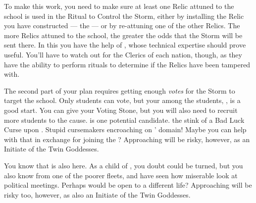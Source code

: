 \documentclass[char]{GL2020}
\begin{document}
To make this work, you need to make sure at least one Relic attuned to the school is used in the Ritual to Control the Storm, either by installing the Relic you have constructed — the \iHorseshoe{} — or by re-attuning one of the other Relics. The more Relics attuned to the school, the greater the odds that the Storm will be sent there. In this you have the help of \cChupInventor{}, whose technical expertise should prove useful. You'll have to watch out for the Clerics of each nation, though, as they have the ability to perform rituals to determine if the Relics have been tampered with. 

The second part of your plan requires getting enough \emph{votes} for the Storm to target the school. Only students can vote, but your \pGoatie{} among the students, \cChupStudent{}, is a good start. You can give \cChupStudent{\them} your Voting Stone, but you will also need to recruit more students to the cause. \cInitiate{\full} is one potential candidate. \cInitiate{\They} \cInitiate{\have} the stink of a Bad Luck Curse upon \cInitiate{\them}. Stupid \pFarm{} cursemakers encroaching on \cGenesis{}' domain! Maybe you can help \cInitiate{\them} with that in exchange for joining the \pGoaties{}? Approaching \cInitiate{\them} will be risky, however, as \cInitiate{\theyare} an Initiate of the Twin Goddesses. 

You know that \cWarlordDaughter{\full} is also here. As a child of \cLoud{}, you doubt \cWarlordDaughter{\they} could be turned, but you also know \cWarlordDaughter{\theyare} from one of the poorer fleets, and have seen how miserable \cWarlordDaughter{\they} look\cWarlordDaughter{\verbs} at political meetings. Perhaps \cWarlordDaughter{\they} would be open to a different life? Approaching \cWarlordDaughter{} will be risky too, however, as \cWarlordDaughter{\theyare} also an Initiate of the Twin Goddesses. 
\end{document}
